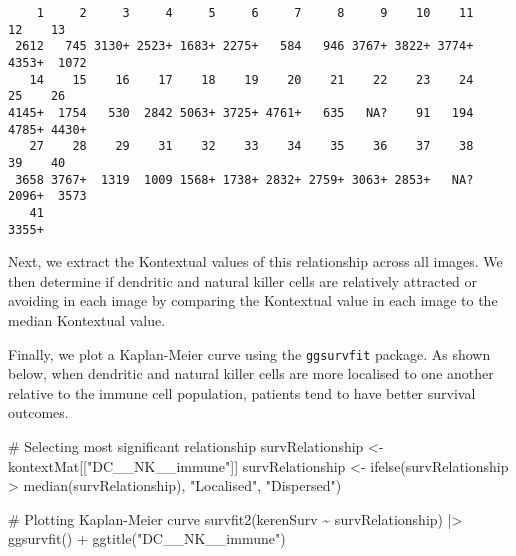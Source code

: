 \documentclass[
  letterpaper,
  DIV=11,
  numbers=noendperiod]{scrreprt}
\newenvironment{Shaded}{\begin{snugshade}}{\end{snugshade}}
\newcommand{\CommentTok}[1]{\textcolor[rgb]{0.37,0.37,0.37}{#1}}
\newcommand{\FunctionTok}[1]{\textcolor[rgb]{0.28,0.35,0.67}{#1}}
\newcommand{\NormalTok}[1]{\textcolor[rgb]{0.00,0.23,0.31}{#1}}
\newcommand{\OtherTok}[1]{\textcolor[rgb]{0.00,0.23,0.31}{#1}}
\newcommand{\SpecialCharTok}[1]{\textcolor[rgb]{0.37,0.37,0.37}{#1}}
\newcommand{\StringTok}[1]{\textcolor[rgb]{0.13,0.47,0.30}{#1}}
\begin{document}
\begin{Shaded}
\end{Shaded}

\begin{verbatim}
    1     2     3     4     5     6     7     8     9    10    11    12    13 
 2612   745 3130+ 2523+ 1683+ 2275+   584   946 3767+ 3822+ 3774+ 4353+  1072 
   14    15    16    17    18    19    20    21    22    23    24    25    26 
4145+  1754   530  2842 5063+ 3725+ 4761+   635   NA?    91   194 4785+ 4430+ 
   27    28    29    31    32    33    34    35    36    37    38    39    40 
 3658 3767+  1319  1009 1568+ 1738+ 2832+ 2759+ 3063+ 2853+   NA? 2096+  3573 
   41 
3355+ 
\end{verbatim}

Next, we extract the Kontextual values of this relationship across all
images. We then determine if dendritic and natural killer cells are
relatively attracted or avoiding in each image by comparing the
Kontextual value in each image to the median Kontextual value.

Finally, we plot a Kaplan-Meier curve using the \texttt{ggsurvfit}
package. As shown below, when dendritic and natural killer cells are
more localised to one another relative to the immune cell population,
patients tend to have better survival outcomes.

\begin{Shaded}
\begin{Highlighting}[]
\CommentTok{\# Selecting most significant relationship}
\NormalTok{survRelationship }\OtherTok{\textless{}{-}}\NormalTok{ kontextMat[[}\StringTok{"DC\_\_NK\_\_immune"}\NormalTok{]]}
\NormalTok{survRelationship }\OtherTok{\textless{}{-}} \FunctionTok{ifelse}\NormalTok{(survRelationship }\SpecialCharTok{\textgreater{}} \FunctionTok{median}\NormalTok{(survRelationship), }\StringTok{"Localised"}\NormalTok{, }\StringTok{"Dispersed"}\NormalTok{)}

\CommentTok{\# Plotting Kaplan{-}Meier curve}
\FunctionTok{survfit2}\NormalTok{(kerenSurv }\SpecialCharTok{\textasciitilde{}}\NormalTok{ survRelationship) }\SpecialCharTok{|\textgreater{}}
  \FunctionTok{ggsurvfit}\NormalTok{() }\SpecialCharTok{+}
  \FunctionTok{ggtitle}\NormalTok{(}\StringTok{"DC\_\_NK\_\_immune"}\NormalTok{)}
\end{Highlighting}
\end{Shaded}
\end{document}
